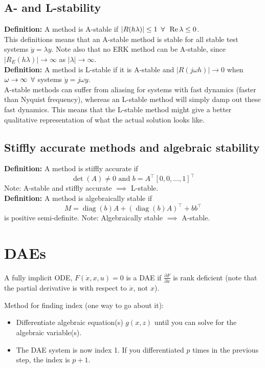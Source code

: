 \subsection{A- and L-stability}
\textbf{Definition:} A method is A-stable if $|R(h\lambda)| \leq 1 \enskip \forall \enskip \operatorname{Re} \lambda \leq 0$.\\
This definitions means that an A-stable method is stable for all stable test systems $\dot{y} = \lambda y$. Note also that no ERK method can be A-stable, since $|R_E(h\lambda)| \to \infty$ as $|\lambda| \to \infty$.\\
\textbf{Definition:} A method is L-stable if it is A-stable and $|R(j\omega h)| \to 0$ when $\omega \to \infty \enskip \forall$ systems $\dot{y} = j\omega y$.\\
A-stable methods can suffer from aliasing for systems with fast dynamics (faster than Nyquist frequency), whereas an L-stable method will simply damp out these fast dynamics. This means that the L-stable method might give a better qualitative representation of what the actual solution looks like.

\subsection{Stiffly accurate methods and algebraic stability}
\textbf{Definition:} A method is stiffly accurate if
\begin{equation}
    \det(A) \neq 0 \text{ and } b = A^\top [0, 0, ..., 1]^\top
\end{equation}
Note: A-stable and stiffly accurate $\implies$ L-stable.\\
\textbf{Definition:} A method is algebraically stable if 
\begin{equation}
    M = \operatorname{diag}(b)A + (\operatorname{diag}(b)A)^\top + bb^\top
\end{equation}
is positive semi-definite. Note: Algebraically stable $\implies$ A-stable.

\section{DAEs}
A fully implicit ODE, $F(\dot{x}, x, u) = 0$ is a DAE if $\frac{\partial F}{\partial \dot{x}}$ is rank deficient (note that the partial derivative is with respect to $\dot{x}$, not $x$).

Method for finding index (one way to go about it):
\begin{itemize}
    \item Differentiate algebraic equation(s) $g(x,z)$ until you can solve for the algebraic variable(s).
    \item The DAE system is now index 1. If you differentiated $p$ times in the previous step, the index is $p+1$.
\end{itemize}

